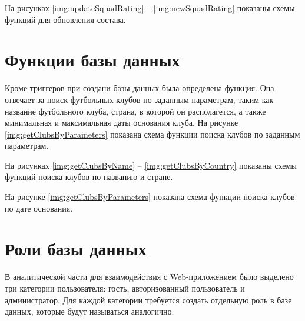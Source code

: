 \clearpage

На рисунках \ref{img:updateSquadRating} -- \ref{img:newSquadRating} показаны схемы функций для обновления состава.


\clearpage

\section{Функции базы данных}

Кроме триггеров при создани базы данных была определена функция. Она отвечает за поиск футбольных клубов по заданным параметрам, таким как название футбольного клуба, страна, в которой он располагется, а также минимальная и максимальная даты основания клуба. На рисунке \ref{img:getClubsByParameters} показана схема функции поиска клубов по заданным параметрам.


\clearpage

На рисунках \ref{img:getClubsByName} -- \ref{img:getClubsByCountry} показаны схемы функций поиска клубов по названию и стране.


\clearpage

На рисунке \ref{img:getClubsByParameters} показана схема функции поиска клубов по дате основания.


\clearpage

\section{Роли базы данных}

В аналитической части для взаимодействия с Web-приложением было выделено три категории пользователя: гость, авторизованный пользователь и администратор. Для каждой категории требуется создать отдельную роль в базе данных, которые будут называться аналогично.

